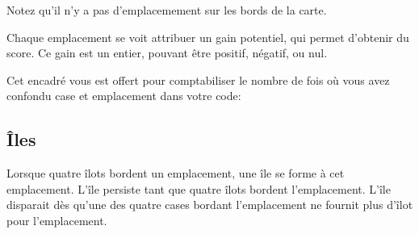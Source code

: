 Notez qu'il n'y a pas d'emplacemement sur les bords de la carte.

Chaque emplacement se voit attribuer un gain potentiel, qui permet d'obtenir du
score.
Ce gain est un entier, pouvant être positif, négatif, ou nul.

Cet encadré vous est offert pour comptabiliser le nombre de fois où vous
avez confondu case et emplacement dans votre code:

\begin{center}
\end{center}

\subsection{Îles}
Lorsque quatre îlots bordent un emplacement, une île se forme à cet
emplacement.
L'île persiste tant que quatre îlots bordent l'emplacement.
L'île disparait dès qu'une des quatre cases bordant l'emplacement ne fournit
plus d'îlot pour l'emplacement.

